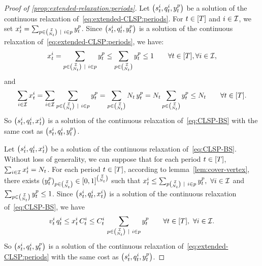 \begin{proof}[Proof of \cref{prop:extended-relaxation:periods}]
Let $\bracket{\inventory_t^i, \quantity_t^i, y_t^p}$ be a solution of the continuous relaxation of~\eqref{eq:extended-CLSP:periods}.
For $t\in\range{\horizon}$ and $i\in\mathcal{I}$, we set $x_t^i=\sum_{p\in{\mathcal{I}\choose N_t}~|~i\in p} y_t^p$.
Since $\bracket{\inventory_t^i, \quantity_t^i, y_t^p}$ is a solution of the continuous relaxation of~\eqref{eq:extended-CLSP:periods}, we have:
\begin{equation}
\setup_t^i
= \sum_{p\in{\REF\choose\nbsetups_t}~|~i\in p} y_t^p
\le \sum_{p\in{\REF\choose\nbsetups_t}} y_t^p
\le 1
\qquad \forall t\in\range{\horizon},\forall i\in\REF,
\end{equation}
and
\begin{equation}
\sum_{i\in\REF}\setup_t^i
= \sum_{i\in\REF}\sum_{p\in{\REF\choose\nbsetups_t}~|~i\in p} y_t^p
= \sum_{p\in{\REF\choose\nbsetups_t}} \nbsetups_t\, y_t^p
= \nbsetups_t \sum_{p\in{\REF\choose\nbsetups_t}} y_t^p
\le \nbsetups_t
\qquad \forall t\in\range{\horizon}.
\end{equation}
So $\bracket{\inventory_t^i, \quantity_t^i, \setup_t^i}$  is a solution of the continuous relaxation of~\eqref{eq:CLSP-BS} with the same cost as $\bracket{\inventory_t^i, \quantity_t^i, y_t^p}$.


Let $\bracket{\inventory_t^i, \quantity_t^i, \setup_t^i}$ be a solution of the continuous relaxation of~\eqref{eq:CLSP-BS}. Without loss of generality, we can suppose that for each period $t\in\range{\horizon}$, $\sum_{i\in\mathcal{I}}x_t^i=N_t$.
For each period $t\in\range{\horizon}$, according to lemma~\cref{lem:cover-vertex}, there exists
$\bracket{y_t^p}_{p\in{\REF\choose\nbsetups_t}}\in\sqbracket{0,1}^{\REF\choose\nbsetups_t}$ such that
$x_t^i \le \sum_{p{\mathcal{I}\choose N_t}~|~i\in p} y_t^p,\ \forall i\in\mathcal{I}$ and
$\sum_{p\in{\mathcal{I}\choose N_t}}y_t^p \le 1$.
Since $\bracket{\inventory_t^i, \quantity_t^i, \setup_t^i}$ is a solution of the continuous relaxation of~\eqref{eq:CLSP-BS}, we have
\begin{equation}
\rate_t^i\, \quantity_t^i
\le \setup_t^i\, \capacity_t^i
\le \capacity_t^i\, \sum_{p\in{\REF\choose\nbsetups_t}~|~i\in p} y_t^p
\qquad \forall t\in\range{\horizon},\ \forall i\in\REF.
\end{equation}
So $\bracket{\inventory_t^i, \quantity_t^i, y_t^p}$ is a solution of the continuous relaxation of~\eqref{eq:extended-CLSP:periods} with the same cost as $\bracket{\inventory_t^i, \quantity_t^i, y_t^p}$.
\end{proof}



